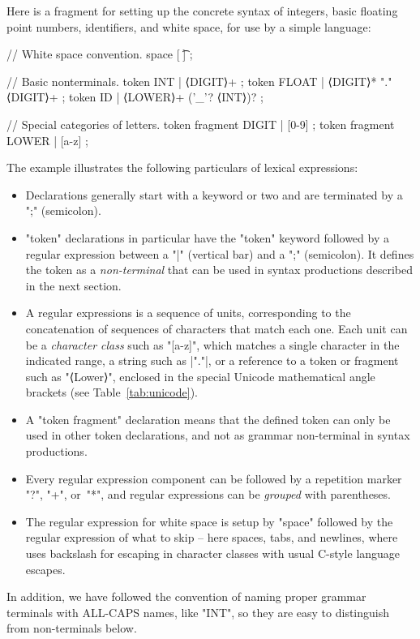 \documentclass[11pt]{article} %
\begin{document}
\begin{example}\label{ex:lexical}
  Here is a \HAX fragment for setting up the concrete syntax of integers, basic floating point
  numbers, identifiers, and white space, for use by a simple language:
\begin{hacs}[xleftmargin=\parindent,numbers=right,texcl]
// White space convention.
space [ \t\n] ;

// Basic nonterminals.
token INT      | ⟨DIGIT⟩+ ;
token FLOAT    | ⟨DIGIT⟩* "." ⟨DIGIT⟩+ ;
token ID       | ⟨LOWER⟩+ ('_'? ⟨INT⟩)? ;

// Special categories of letters.
token fragment DIGIT  | [0-9] ;
token fragment LOWER  | [a-z] ;
\end{hacs}
  The example illustrates the following particulars of \HAX lexical expressions:
  \begin{itemize}

  \item Declarations generally start with a keyword or two and are terminated by a ";" (semicolon).

  \item "token" declarations in particular have the "token" keyword followed by a regular expression
    between a "|" (vertical bar) and a ";" (semicolon). It defines the token as a
    \emph{non-terminal} that can be used in syntax productions described in the next section.

  \item A regular expressions is a sequence of units, corresponding to the concatenation of
    sequences of characters that match each one.  Each unit can be a \emph{character class} such as
    "[a-z]", which matches a single character in the indicated range, a string such as \hacsc|"."|,
    or a reference to a token or fragment such as "⟨Lower⟩", enclosed in the special Unicode
    mathematical angle brackets (see Table~\ref{tab:unicode}).

  \item A "token fragment" declaration means that the defined token can only be used in other token
    declarations, and not as grammar non-terminal in syntax productions.

  \item Every regular expression component can be followed by a repetition marker "?", "+", or~"*",
    and regular expressions can be \emph{grouped} with parentheses.

  \item The regular expression for white space is setup by "space" followed by the regular
    expression of what to skip -- here spaces, tabs, and newlines, where \HAX uses backslash for
    escaping in character classes with usual C-style language escapes.

  \end{itemize}
  In addition, we have followed the convention of naming proper grammar terminals with ALL-CAPS
  names, like "INT", so they are easy to distinguish from non-terminals below.
\end{example}
\end{document}
